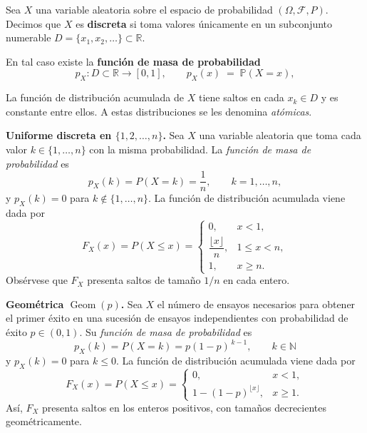 \documentclass[../Main.tex]{subfiles}
\begin{document}
\begin{definition}
Sea $X$ una variable aleatoria sobre el espacio de probabilidad
$(\Omega,\mathcal F,P)$.
Decimos que $X$ es \textbf{discreta} si toma valores únicamente en un
subconjunto numerable $D=\{x_1,x_2,\dots\}\subset\mathbb R$.

En tal caso existe la \textbf{función de masa de probabilidad}
\[
    p_X:D\subset\mathbb R\longrightarrow[0,1],
    \qquad
    p_X(x)\;=\;\mathbb{P}(X=x),
\]

\end{definition}
\begin{remark}
    
La función de distribución acumulada de $X$ tiene saltos en cada $x_k\in D$ y es constante entre ellos.  A estas distribuciones se les denomina \emph{atómicas}.
\end{remark}
\begin{example}
\textbf{Uniforme discreta en \(\{1,2,\dots,n\}\).}\;
Sea \(X\) una variable aleatoria que toma cada valor
\(k\in\{1,\dots,n\}\) con la misma probabilidad.
La \emph{función de masa de probabilidad} es  
\[
    p_X(k)=P(X=k)=\frac{1}{n},
    \qquad k=1,\dots,n,
\]
y \(p_X(k)=0\) para \(k\notin\{1,\dots,n\}\).
La función de distribución acumulada viene dada por
\[
    F_X(x)=P(X\le x)=
    \begin{cases}
        0, & x<1,\\[4pt]
        \dfrac{\lfloor x\rfloor}{n}, & 1\le x<n,\\[10pt]
        1, & x\ge n.
    \end{cases}
\]
Obsérvese que \(F_X\) presenta saltos de tamaño \(1/n\) en cada entero.
\end{example}
\begin{example}
\textbf{Geométrica \(\operatorname{Geom}(p)\).}\;
Sea \(X\) el número de ensayos necesarios para obtener el primer éxito
en una sucesión de ensayos independientes con probabilidad
de éxito \(p\in(0,1)\).
Su \emph{función de masa de probabilidad} es
\[
    p_X(k)=P(X=k)=p(1-p)^{\,k-1},
    \qquad k\in\mathbb{N}
\]
y \(p_X(k)=0\) para \(k\le 0\).
La función de distribución acumulada viene dada por
\[
    F_X(x)=P(X\le x)=
    \begin{cases}
        0, & x<1,\\[6pt]
        1-(1-p)^{\lfloor x\rfloor}, & x\ge 1.
    \end{cases}
\]
Así, \(F_X\) presenta saltos en los enteros positivos,
con tamaños decrecientes geométricamente.
\end{example}
\end{document}

